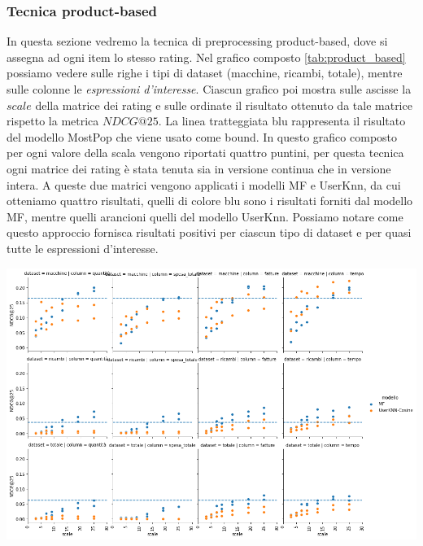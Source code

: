 \subsubsection{Tecnica product-based}
In questa sezione vedremo la tecnica di preprocessing product-based, dove si assegna ad ogni item lo stesso rating.
Nel grafico composto \ref{tab:product_based} possiamo vedere sulle righe i tipi di dataset (macchine, ricambi, totale), mentre sulle colonne le \textit{espressioni d'interesse}. Ciascun grafico poi mostra sulle ascisse la $scale$ della matrice dei rating e sulle ordinate il risultato ottenuto da tale matrice rispetto la metrica $NDCG@25$. 
La linea tratteggiata blu rappresenta il risultato del modello MostPop che viene usato come bound.
In questo grafico composto per ogni valore della scala vengono riportati quattro puntini, per questa tecnica ogni matrice dei rating è stata tenuta sia in versione continua che in versione intera. A queste due matrici vengono applicati i modelli MF e UserKnn, da cui otteniamo quattro risultati, quelli di colore blu sono i risultati forniti dal modello MF, mentre quelli arancioni quelli del modello UserKnn. Possiamo notare come questo approccio fornisca risultati positivi per ciascun tipo di dataset e per quasi tutte le espressioni d'interesse.
\begin{center}
    \includegraphics[width=15cm]{figures/prodotto.png}
    \label{tab:product_based}
\end{center}


